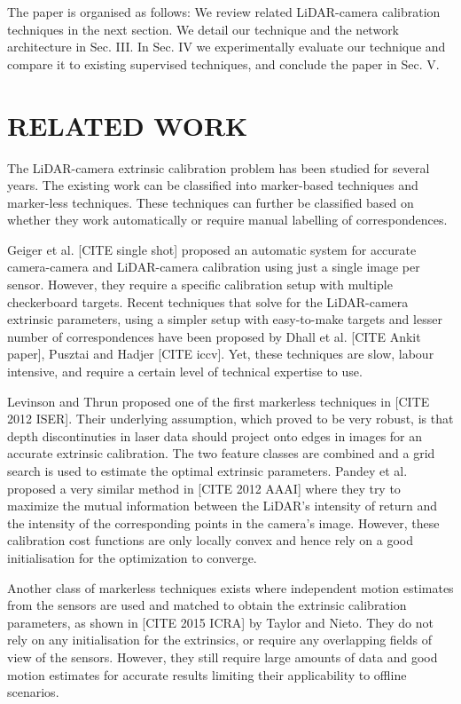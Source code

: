 \documentclass[letterpaper, 10 pt, conference]{ieeeconf}  %
\begin{document}
The paper is organised as follows: We review related LiDAR-camera calibration techniques in the next section. We detail our
technique and the network architecture in Sec. III. In Sec. IV we experimentally evaluate our technique and compare it to existing supervised techniques, 
and conclude the paper in Sec. V.

\section{RELATED WORK}

The LiDAR-camera extrinsic calibration problem has been studied for several years. The existing work can be classified into
marker-based techniques and marker-less techniques. These techniques can further be classified based on whether they work automatically
or require manual labelling of correspondences.

Geiger et al. [CITE single shot] proposed an automatic system for accurate camera-camera and LiDAR-camera calibration using just a single image per sensor. However,
they require a specific calibration setup with multiple checkerboard targets. 
Recent techniques that solve for the LiDAR-camera extrinsic parameters, using a simpler setup with easy-to-make targets and lesser number of correspondences have been proposed by Dhall et al. [CITE Ankit paper], Pusztai and Hadjer [CITE iccv].
Yet, these techniques are slow, labour intensive, and require a certain level of technical expertise to use.

Levinson and Thrun proposed one of the first markerless techniques in [CITE 2012 ISER]. Their underlying assumption, which proved to be very robust,
is that depth discontinuties in laser data should project onto edges in images for an accurate extrinsic calibration. The two feature classes are
combined and a grid search is used to estimate the optimal extrinsic parameters. Pandey et al. proposed a very similar method in [CITE 2012 AAAI]
where they try to maximize the mutual information between the LiDAR's intensity of return and the intensity of the corresponding points in the camera's image. However, these calibration
cost functions are only locally convex and hence rely on a good initialisation for the optimization to converge.

Another class of markerless techniques exists where independent motion estimates from the sensors are used and matched to obtain the extrinsic
calibration parameters, as shown in [CITE 2015 ICRA] by Taylor and Nieto. They do not rely on any initialisation for the extrinsics, or require any overlapping
fields of view of the sensors. However, they still require large amounts of data and good motion estimates for accurate results limiting their applicability to offline scenarios.
\end{document}
